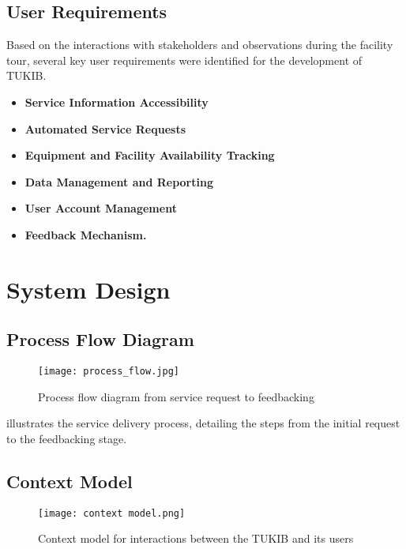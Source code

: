 \subsection{User Requirements}

Based on the interactions with stakeholders and observations during the facility tour, several key user requirements were identified for the development of TUKIB. 

\begin{itemize}
	\item \textbf{Service Information Accessibility}
	\item \textbf{Automated Service Requests}
	\item \textbf{Equipment and Facility Availability Tracking}
	\item \textbf{Data Management and Reporting}
	\item \textbf{User Account Management}
	\item \textbf{Feedback Mechanism.}
\end{itemize}

\section{System Design}

\subsection{Process Flow Diagram}

\begin{figure}[h]
	\centering 
	\texttt{[image: process\_flow.jpg]}
	\caption{Process flow diagram from service request to feedbacking}
	\label{fig:process_flow}
\end{figure}

 illustrates the service delivery process, detailing the steps from the initial request to the feedbacking stage.

\subsection{Context Model}

\begin{figure}[h]
	\centering 
	\texttt{[image: context model.png]}
	\caption{Context model for interactions between the TUKIB and its users}
	\label{fig:context_model}
\end{figure}

